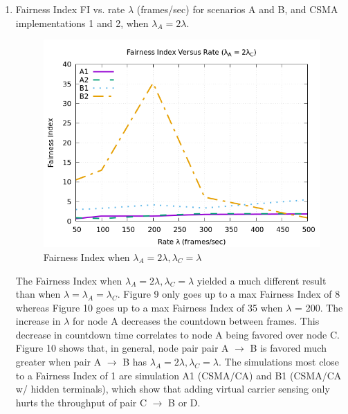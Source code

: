 \documentclass[12pt]{article}
\begin{document}
\begin{enumerate}
    
\clearpage  
        \item {
            Fairness Index FI vs. rate \(\lambda{}\) (frames/sec) for scenarios A and B, and CSMA implementations 1 and 2, when \(\lambda{}_A = 2\lambda{}\).
            
            \begin{figure}[!htb]
                \centering
                \includegraphics[width=5in]{3B.png}
                \caption{Fairness Index when \(\lambda{}_A = 2\lambda{}, \lambda{}_C = \lambda{}\) }
                \label{fig:3B}
            \end{figure}

            The Fairness Index when \(\lambda{}_A = 2\lambda{}, \lambda{}_C = \lambda{}\) yielded a much different result than when \(\lambda{} = \lambda{}_A = \lambda{}_C\). Figure 9 only goes up to a max Fairness Index of 8 whereas Figure 10 goes up to a max Fairness Index of 35 when \(\lambda\) = 200. The increase in \(\lambda\) for node A decreases the countdown between frames. This decrease in countdown time correlates to node A being favored over node C. Figure 10 shows that, in general, node pair pair A \(\rightarrow\) B is favored much greater when pair A \(\rightarrow\) B has \(\lambda{}_A = 2\lambda{}, \lambda{}_C = \lambda{}\). The simulations most close to a Fairness Index of 1 are simulation A1 (CSMA/CA) and B1 (CSMA/CA w/ hidden terminals), which show that adding virtual carrier sensing only hurts the throughput of pair C \(\rightarrow\) B or D.
        }    
    \end{enumerate}
\end{document}

